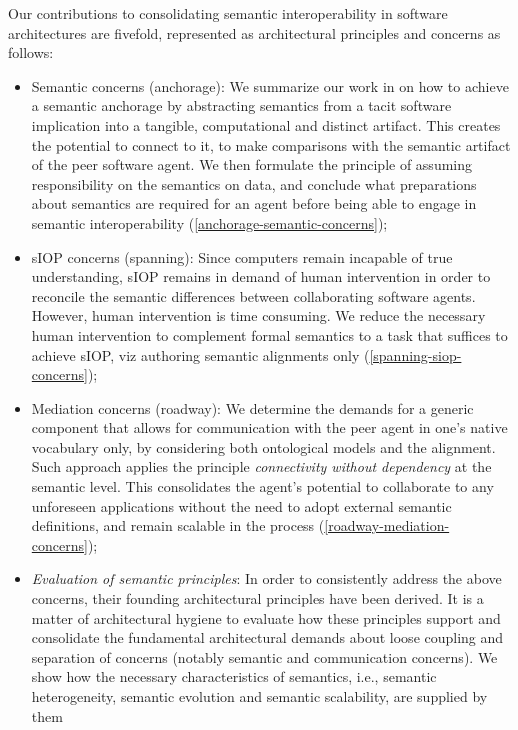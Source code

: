 \documentclass[sort&compress,preprint,authoryear,3p,twocolumn]{elsarticle}
\providecommand{\tightlist}{%
  \setlength{\itemsep}{0pt}\setlength{\parskip}{0pt}}
\begin{document}
Our contributions to consolidating semantic interoperability in software
architectures are fivefold, represented as architectural principles and
concerns as follows:

\begin{itemize}
\tightlist
\item
  Semantic concerns (anchorage): We summarize our work in
  \citep{Brandt2021a} on how to achieve a semantic anchorage by
  abstracting semantics from a tacit software implication into a
  tangible, computational and distinct artifact. This creates the
  potential to connect to it, to make comparisons with the semantic
  artifact of the peer software agent. We then formulate the principle
  of assuming responsibility on the semantics on data, and conclude what
  preparations about semantics are required for an agent before being
  able to engage in semantic interoperability
  (\cref{anchorage-semantic-concerns});
\item
  sIOP concerns (spanning): Since computers remain incapable of true
  understanding, sIOP remains in demand of human intervention in order
  to reconcile the semantic differences between collaborating software
  agents. However, human intervention is time consuming. We reduce the
  necessary human intervention to complement formal semantics to a task
  that suffices to achieve sIOP, viz authoring semantic alignments only
  (\cref{spanning-siop-concerns});
\item
  Mediation concerns (roadway): We determine the demands for a generic
  component that allows for communication with the peer agent in one's
  native vocabulary only, by considering both ontological models and the
  alignment. Such approach applies the principle \emph{connectivity
  without dependency} at the semantic level. This consolidates the
  agent's potential to collaborate to any unforeseen applications
  without the need to adopt external semantic definitions, and remain
  scalable in the process (\cref{roadway-mediation-concerns});
\item
  \emph{Evaluation of semantic principles}: In order to consistently
  address the above concerns, their founding architectural principles
  have been derived. It is a matter of architectural hygiene to evaluate
  how these principles support and consolidate the fundamental
  architectural demands about loose coupling and separation of concerns
  (notably semantic and communication concerns). We show how the
  necessary characteristics of semantics, i.e., semantic heterogeneity,
  semantic evolution and semantic scalability, are supplied by them

\end{itemize}
\end{document}
